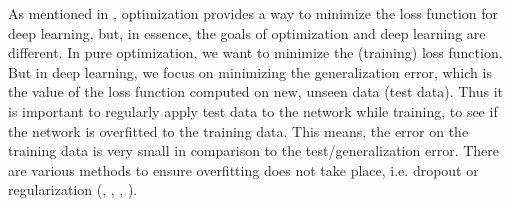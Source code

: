 \documentclass[12pt,DIV14,BCOR12mm,a4paper,footexclude,headinclude,halfparskip-,twoside,openright,openany,cleardoubleempty,idxtotoc,bibtotoc]{scrreprt} %
\numberwithin{equation}{chapter}
\begin{document}
As mentioned in \cite{DeepLearningDive}, optimization provides a way to minimize the loss function for deep learning, but, in essence, the goals of optimization and deep learning are different. In pure optimization, we want to minimize the (training) loss function. But in deep learning, we focus on minimizing the generalization error, which is the value of the loss function computed on new, unseen data (test data). Thus it is important to regularly apply test data to the network while training, to see if the network is overfitted to the training data. This means, the error on the training data is very small in comparison to the test/generalization error. There are various methods to ensure overfitting does not take place, i.e. dropout or regularization (\cite{Goodfellow-et-al-2016}, \cite{Nielsen-Michael}, \cite{DeepLearningDive}, \cite{Bishop}).\\
\end{document}
